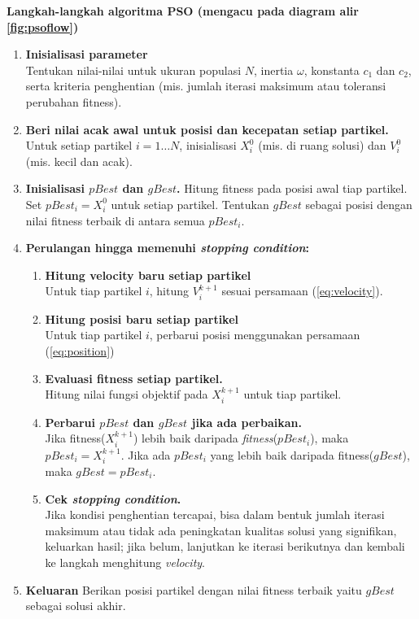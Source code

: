 \documentclass[a4paper,twoside]{article}
\begin{document}
	\textbf{Langkah-langkah algoritma PSO (mengacu pada diagram alir \ref{fig:psoflow})}
	\begin{enumerate}
		\item \textbf{Inisialisasi parameter} \\
		Tentukan nilai-nilai untuk ukuran populasi $N$, inertia $\omega$, konstanta $c_1$ dan $c_2$, serta kriteria penghentian (mis. jumlah iterasi maksimum atau toleransi perubahan fitness).
		\item \textbf{Beri nilai acak awal untuk posisi dan kecepatan setiap partikel.} Untuk setiap partikel $i=1\ldots N$, inisialisasi $X_i^0$ (mis. di ruang solusi) dan $V_i^0$ (mis. kecil dan acak).
		\item \textbf{Inisialisasi $pBest$ dan $gBest$.} Hitung fitness pada posisi awal tiap partikel. Set $pBest_i = X_i^0$ untuk setiap partikel. Tentukan $gBest$ sebagai posisi dengan nilai fitness terbaik di antara semua $pBest_i$.
		\item \textbf{Perulangan hingga memenuhi \textit{stopping condition}:}
		\begin{enumerate}
			\item \textbf{Hitung velocity baru setiap partikel} \\
			Untuk tiap partikel $i$, hitung $V_i^{k+1}$ sesuai persamaan (\ref{eq:velocity}).
			\item \textbf{Hitung posisi baru setiap partikel} \\
			Untuk tiap partikel $i$, perbarui posisi menggunakan persamaan (\ref{eq:position})
			\item \textbf{Evaluasi fitness setiap partikel.} \\
			Hitung nilai fungsi objektif pada $X_i^{k+1}$ untuk tiap partikel.
			\item \textbf{Perbarui $pBest$ dan $gBest$ jika ada perbaikan.} \\
			Jika fitness($X_i^{k+1}$) lebih baik daripada \textit{fitness}($pBest_i$), maka $pBest_i = X_i^{k+1}$. Jika ada $pBest_i$ yang lebih baik daripada fitness($gBest$), maka $gBest = pBest_i$.
			\item \textbf{Cek \textit{stopping condition}.} \\
			Jika kondisi penghentian tercapai, bisa dalam bentuk jumlah iterasi maksimum atau tidak ada peningkatan kualitas solusi yang signifikan, keluarkan hasil; jika belum, lanjutkan ke iterasi berikutnya dan kembali ke langkah menghitung \textit{velocity}.
		\end{enumerate}
		\item \textbf{Keluaran} Berikan posisi partikel dengan nilai fitness terbaik yaitu $gBest$ sebagai solusi akhir.
	\end{enumerate}
	
\end{document}
